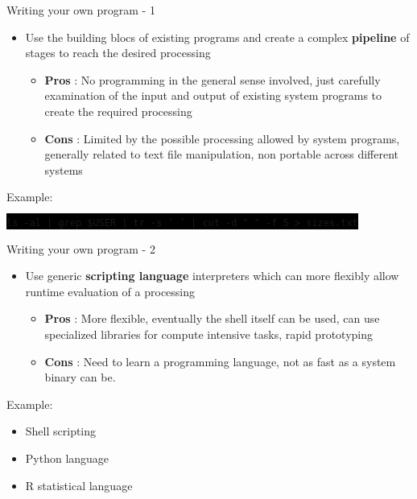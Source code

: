 \documentclass[unknownkeysallowed, 10pt, a4 paper, handout]{beamer}
\newcommand{\code}[1]{\colorbox{black}{\color{green}\texttt{#1}}}
\begin{document}
\begin{frame}[label=pipelining]{Writing your own program - 1}
  \begin{itemize}
    \item Use the building blocs of existing programs and create a complex
      \textbf{pipeline} of stages to reach the desired processing
      \begin{itemize}
        \item \textbf{Pros} : No programming in the general sense involved,
          just carefully examination of the input and output of existing
          system programs to create the required processing
        \item \textbf{Cons} : Limited by the possible processing allowed by
          system programs, generally related to text file manipulation,
          non portable across different systems
      \end{itemize}
  \end{itemize}
  Example:
  \begin{center}
    \code{ls -al | grep \${USER} | tr -s ' ' | cut -d " " -f 5 > sizes.txt}
  \end{center}
\end{frame}


\begin{frame}[label=scripting]{Writing your own program - 2}
  \begin{itemize}
    \item Use generic \textbf{scripting language} interpreters which can more
      flexibly allow runtime evaluation of a processing
      \begin{itemize}
        \item \textbf{Pros} : More flexible, eventually the shell itself can be
          used, can use specialized libraries for compute intensive tasks,
          rapid prototyping
        \item \textbf{Cons} : Need to learn a programming language, not as
          fast as a system binary can be.
      \end{itemize}
  \end{itemize}
  Example:
  \begin{itemize}
    \item Shell scripting
    \item Python language
    \item R statistical language
  \end{itemize}
\end{frame}
\end{document}
